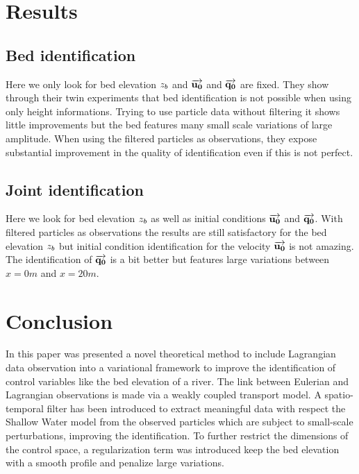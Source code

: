 \clearpage

\section{Results}
\subsection{Bed identification}
    
Here we only look for bed elevation $z_b$ and $\overrightarrow{\mathbf{u_0}}$ and $\overrightarrow{\mathbf{q_0}}$ are fixed.
They show through their twin experiments that bed identification is not possible when using only height informations. 
Trying to use particle data without filtering it shows little improvements but the bed features many small scale variations of large amplitude.
When using the filtered particles as observations, they expose substantial improvement in the quality of identification even if this is not perfect.

\subsection{Joint identification}
    
Here we look for bed elevation $z_b$ as well as initial conditions $\overrightarrow{\mathbf{u_0}}$ and $\overrightarrow{\mathbf{q_0}}$.
With filtered particles as observations the results are still satisfactory for the bed elevation $z_b$ but initial condition identification for the velocity $\overrightarrow{\mathbf{u_0}}$ is not amazing. The identification of $\overrightarrow{\mathbf{q_0}}$ is a bit better but features large variations between $x=0m$ and $x=20m$.

\section{Conclusion}

In this paper was presented a novel theoretical method to include Lagrangian data observation into a variational framework to improve the identification of control variables like the bed elevation of a river. The link between Eulerian and Lagrangian observations is made via a weakly coupled transport model. A spatio-temporal filter has been introduced to extract meaningful data with respect the Shallow Water model from the observed particles which are subject to small-scale perturbations, improving the identification. To further restrict the dimensions of the control space, a regularization term was introduced keep the bed elevation with a smooth profile and penalize large variations. 






 
 
 
 
 
 
 
 
 
 
 
 
 
